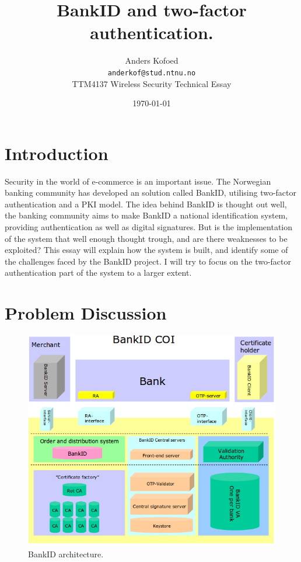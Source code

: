 \documentclass[a4paper,11pt]{article}
\title{BankID and two-factor authentication.}
\author{Anders Kofoed \\
	\texttt{anderkof@stud.ntnu.no}\\
	TTM4137 Wireless Security Technical Essay}
\date{\today}
\begin{document}
\maketitle

\section{Introduction}
Security in the world of e-commerce is an important issue. The Norwegian banking community has developed an solution called BankID, utilising two-factor authentication and a PKI model. The idea behind BankID is thought out well, the banking community aims to make BankID a national identification system, providing authentication as well as digital signatures. But is the implementation of the system that well enough thought trough, and are there weaknesses to be exploited? This essay will explain how the system is built, and identify some of the challenges faced by the BankID project. I will try to focus on the two-factor authentication part of the system to a larger extent. 


\section{Problem Discussion}
\begin{figure}
  \centering
  \includegraphics[scale=0.35]{architecture} %
  \vspace{-0.2cm}
  \caption{BankID architecture.}
  \label{fig:arch}
\end{figure}
\end{document}

